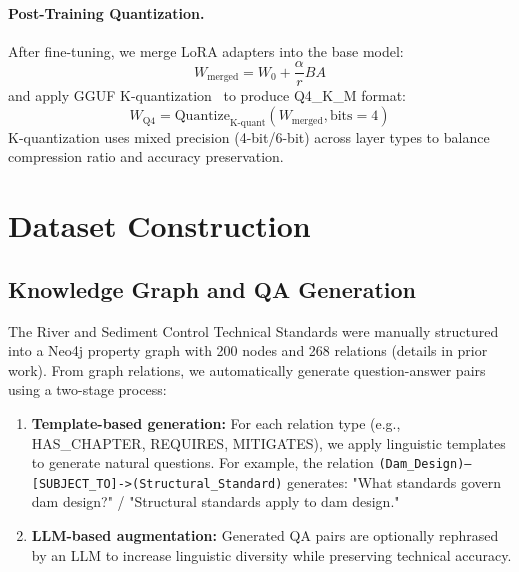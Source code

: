 \documentclass[twocolumn]{article}
\begin{document}
\paragraph{Post-Training Quantization.}
After fine-tuning, we merge LoRA adapters into the base model:
\begin{equation}
W_{\text{merged}} = W_0 + \frac{\alpha}{r} B A
\label{eq:merge}
\end{equation}
and apply GGUF K-quantization~\cite{gerganov2023ggml} to produce Q4\_K\_M format:
\begin{equation}
W_{\text{Q4}} = \text{Quantize}_{\text{K-quant}}(W_{\text{merged}}, \text{bits}=4)
\label{eq:q4}
\end{equation}
K-quantization uses mixed precision (4-bit/6-bit) across layer types to balance
compression ratio and accuracy preservation.

\section{Dataset Construction}
\label{sec:data}

\subsection{Knowledge Graph and QA Generation}

The River and Sediment Control Technical Standards were manually structured into
a Neo4j property graph with 200 nodes and 268 relations (details in prior work).
From graph relations, we automatically generate question-answer pairs using a 
two-stage process:
\begin{enumerate}
  \item \textbf{Template-based generation:} For each relation type (e.g., HAS\_CHAPTER,
        REQUIRES, MITIGATES), we apply linguistic templates to generate natural questions.
        For example, the relation \texttt{(Dam\_Design)--[SUBJECT\_TO]->}\allowbreak\texttt{(Structural\_Standard)}
        generates: "What standards govern dam design?" / "Structural standards apply to dam design."
  \item \textbf{LLM-based augmentation:} Generated QA pairs are optionally rephrased by
        an LLM to increase linguistic diversity while preserving technical accuracy.
\end{enumerate}
\end{document}
